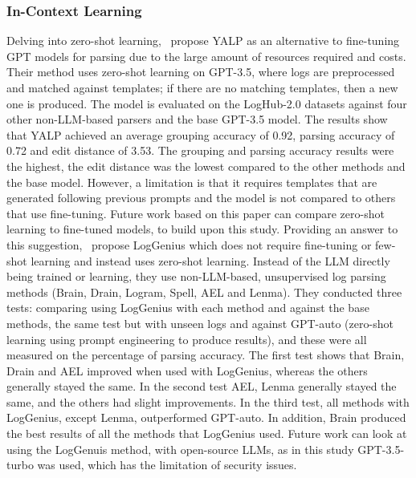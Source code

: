 \subsubsection{In-Context Learning}
Delving into zero-shot learning,~\cite{zhi2024llm} propose YALP as an alternative to fine-tuning GPT models for parsing due to the large amount of resources required and costs. Their method uses zero-shot learning on GPT-3.5, where logs are preprocessed and matched against templates; if there are no matching templates, then a new one is produced. The model is evaluated on the LogHub-2.0 datasets against four other non-LLM-based parsers and the base GPT-3.5 model. The results show that YALP achieved an average grouping accuracy of 0.92, parsing accuracy of 0.72 and edit distance of 3.53. The grouping and parsing accuracy results were the highest, the edit distance was the lowest compared to the other methods and the base model. However, a limitation is that it requires templates that are generated following previous prompts and the model is not compared to others that use fine-tuning. Future work based on this paper can compare zero-shot learning to fine-tuned models, to build upon this study. Providing an answer to this suggestion,~\cite{yu2024loggenius} propose LogGenius which does not require fine-tuning or few-shot learning and instead uses zero-shot learning. Instead of the LLM directly being trained or learning, they use non-LLM-based, unsupervised log parsing methods (Brain, Drain, Logram, Spell, AEL and Lenma). They conducted three tests: comparing using LogGenius with each method and against the base methods, the same test but with unseen logs and against GPT-auto (zero-shot learning using prompt engineering to produce results), and these were all measured on the percentage of parsing accuracy. The first test shows that Brain, Drain and AEL improved when used with LogGenius, whereas the others generally stayed the same. In the second test AEL, Lenma generally stayed the same, and the others had slight improvements. In the third test, all methods with LogGenius, except Lenma, outperformed GPT-auto. In addition, Brain produced the best results of all the methods that LogGenius used. Future work can look at using the LogGenuis method, with open-source LLMs, as in this study GPT-3.5-turbo was used, which has the limitation of security issues.   

